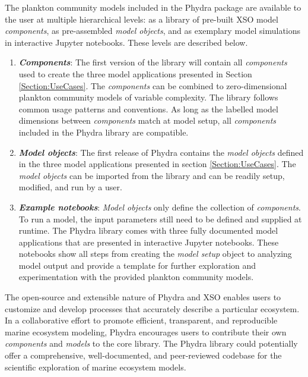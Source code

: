 \documentclass[journal abbreviation, manuscript]{copernicus}
\begin{document}
The plankton community models included in the Phydra package are available to the user at multiple hierarchical levels: as a library of pre-built XSO model \textit{components}, as pre-assembled \textit{model objects}, and as exemplary model simulations in interactive Jupyter notebooks. These levels are described below.

\begin{enumerate}
    \item \textbf{\textit{Components}}: The first version of the library will contain all \textit{components} used to create the three model applications presented in Section \ref{Section:UseCases}. The \textit{components} can be combined to zero-dimensional plankton community models of variable complexity. The library follows common usage patterns and conventions. As long as the labelled model dimensions between \textit{components} match at model setup, all \textit{components} included in the Phydra library are compatible.
    
    \item \textbf{\textit{Model objects}}: The first release of Phydra contains the \textit{model objects} defined in the three model applications presented in section \ref{Section:UseCases}. The \textit{model objects} can be imported from the library and can be readily setup, modified, and run by a user.
    
    \item \textbf{\textit{Example notebooks}}: \textit{Model objects} only define the collection of \textit{components}. To run a model, the input parameters still need to be defined and supplied at runtime. The Phydra library comes with three fully documented model applications that are presented in interactive Jupyter notebooks. These notebooks show all steps from creating the \textit{model setup} object to analyzing model output and provide a template for further exploration and experimentation with the provided plankton community models.
    
\end{enumerate}

The open-source and extensible nature of Phydra and XSO enables users to customize and develop processes that accurately describe a particular ecosystem. In a collaborative effort to promote efficient, transparent, and reproducible marine ecosystem modeling, Phydra encourages users to contribute their own \textit{components} and \textit{models} to the core library. The Phydra library could potentially offer a comprehensive, well-documented, and peer-reviewed codebase for the scientific exploration of marine ecosystem models.
\end{document}
